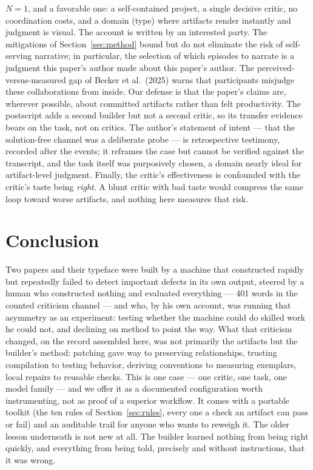 \documentclass[11pt]{article}
\begin{document}
$N{=}1$, and a favorable one: a self-contained project, a single decisive critic, no coordination costs, and a domain (type) where artifacts render instantly and judgment is visual. The account is written by an interested party. The mitigations of Section~\ref{sec:method} bound but do not eliminate the risk of self-serving narrative; in particular, the selection of which episodes to narrate is a judgment this paper's author made about this paper's author. The perceived-versus-measured gap of Becker et al.\ (2025) warns that participants misjudge these collaborations from inside. Our defense is that the paper's claims are, wherever possible, about committed artifacts rather than felt productivity. The postscript adds a second builder but not a second critic, so its transfer evidence bears on the task, not on critics. The author's statement of intent — that the solution-free channel was a deliberate probe — is retrospective testimony, recorded after the events; it reframes the case but cannot be verified against the transcript, and the task itself was purposively chosen, a domain nearly ideal for artifact-level judgment. Finally, the critic's effectiveness is confounded with the critic's taste being \emph{right}. A blunt critic with bad taste would compress the same loop toward worse artifacts, and nothing here measures that risk.

\section{Conclusion}

Two papers and their typeface were built by a machine that constructed rapidly but repeatedly failed to detect important defects in its own output, steered by a human who constructed nothing and evaluated everything — 401 words in the counted criticism channel — and who, by his own account, was running that asymmetry as an experiment: testing whether the machine could do skilled work he could not, and declining on method to point the way. What that criticism changed, on the record assembled here, was not primarily the artifacts but the builder's method: patching gave way to preserving relationships, trusting compilation to testing behavior, deriving conventions to measuring exemplars, local repairs to reusable checks. This is one case — one critic, one task, one model family — and we offer it as a documented configuration worth instrumenting, not as proof of a superior workflow. It comes with a portable toolkit (the ten rules of Section~\ref{sec:rules}, every one a check an artifact can pass or fail) and an auditable trail for anyone who wants to reweigh it. The older lesson underneath is not new at all. The builder learned nothing from being right quickly, and everything from being told, precisely and without instructions, that it was wrong.
\end{document}
